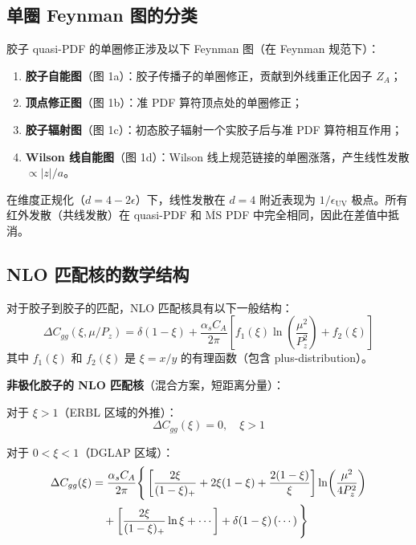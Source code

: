 \documentclass[11pt,a4paper]{ctexart}
\begin{document}
\subsection{单圈 Feynman 图的分类}

胶子 quasi-PDF 的单圈修正涉及以下 Feynman 图（在 Feynman 规范下）：

\begin{enumerate}
  \item \textbf{胶子自能图}（图 1a）：胶子传播子的单圈修正，贡献到外线重正化因子 $Z_A$；
  \item \textbf{顶点修正图}（图 1b）：准 PDF 算符顶点处的单圈修正；
  \item \textbf{胶子辐射图}（图 1c）：初态胶子辐射一个实胶子后与准 PDF 算符相互作用；
  \item \textbf{Wilson 线自能图}（图 1d）：Wilson 线上规范链接的单圈涨落，产生线性发散 $\propto |z|/a$。
\end{enumerate}

在维度正规化（$d = 4 - 2\epsilon$）下，线性发散在 $d=4$ 附近表现为 $1/\epsilon_{\text{UV}}$ 极点。所有红外发散（共线发散）在 quasi-PDF 和 $\overline{\text{MS}}$ PDF 中完全相同，因此在差值中抵消。

\subsection{NLO 匹配核的数学结构}

对于胶子到胶子的匹配，NLO 匹配核具有以下一般结构：
\begin{equation}
\Delta C_{gg}(\xi, \mu/P_z) = \delta(1-\xi) + \frac{\alpha_s C_A}{2\pi}
\left[ f_1(\xi) \ln\!\left(\frac{\mu^2}{P_z^2}\right) + f_2(\xi) \right]
\end{equation}
其中 $f_1(\xi)$ 和 $f_2(\xi)$ 是 $\xi = x/y$ 的有理函数（包含 plus-distribution）。

\textbf{非极化胶子的 NLO 匹配核}（混合方案，短距离分量）：

对于 $\xi > 1$（ERBL 区域的外推）：
\begin{equation}
\Delta C_{gg}(\xi) = 0, \quad \xi > 1
\end{equation}

对于 $0 < \xi < 1$（DGLAP 区域）：
\begin{align}
\Delta C_{gg}(\xi) &= \frac{\alpha_s C_A}{2\pi} \Bigg\{
\left[ \frac{2\xi}{(1-\xi)_+} + 2\xi(1-\xi) + \frac{2(1-\xi)}{\xi} \right]
\ln\!\left(\frac{\mu^2}{4P_z^2}\right) \notag\\
&\quad + \left[ \frac{2\xi}{(1-\xi)_+} \ln\xi + \cdots \right]
+ \delta(1-\xi) \left( \cdots \right) \Bigg\}
\end{align}
\end{document}
